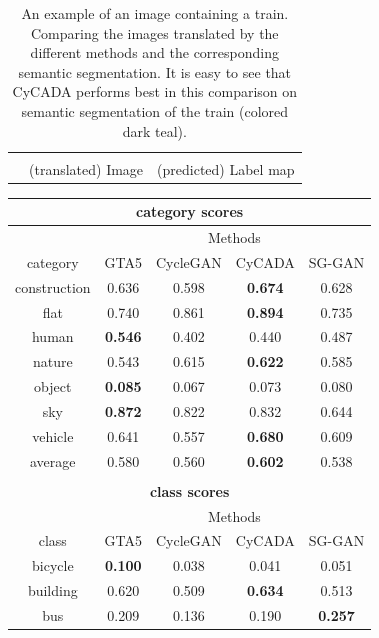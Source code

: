 \begin{table}
\begin{tabular}{cc||c}
\begin{minipage}[c]{0.45\textwidth}
		\end{minipage} \\
		\multicolumn{1}{c}{} & (translated) Image & (predicted) Label map
	\end{tabular} 
	\caption{An example of an image containing a train. Comparing the images translated by the different methods and the corresponding semantic segmentation. It is easy to see that CyCADA performs best in this comparison on semantic segmentation of the train (colored dark teal).}
	\label{table:train}
\end{table}

\begin{table}
	\centering
	\begin{tabular}{|c|c|c|c|c|}
		\multicolumn{5}{c}{\textbf{category scores}}\\
		\hline
		\multicolumn{1}{c}{} & \multicolumn{4}{c}{Methods}\\
		\cline{2-5}
		\multicolumn{1}{c|}{category} & GTA5 & CycleGAN & CyCADA & SG-GAN\\ 
		\hline
		construction & 0.636 & 0.598 & \textbf{0.674} & 0.628\\ 
		\hline 
		flat & 0.740 & 0.861 & \textbf{0.894} & 0.735\\ 
		\hline 
		human & \textbf{0.546} & 0.402 & 0.440 & 0.487\\ 
		\hline 
		nature & 0.543 & 0.615 & \textbf{0.622} & 0.585\\ 
		\hline 
		object & \textbf{0.085} & 0.067 & 0.073 & 0.080\\ 
		\hline 
		sky & \textbf{0.872} & 0.822 & 0.832 & 0.644\\ 
		\hline 
		vehicle & 0.641 & 0.557 & \textbf{0.680} & 0.609\\ 
		\hline \hline
		average & 0.580 & 0.560 & \textbf{0.602} & 0.538\\
		\hline
		\multicolumn{5}{c}{}\\
		\multicolumn{5}{c}{\textbf{class scores}}\\
		\hline
		\multicolumn{1}{c}{} & \multicolumn{4}{c}{Methods}\\
		\cline{2-5}
		\multicolumn{1}{c|}{class} & GTA5 & CycleGAN & CyCADA & SG-GAN\\ 
		\hline
		bicycle & \textbf{0.100} & 0.038 & 0.041 & 0.051\\ 
		\hline 
		building & 0.620 & 0.509 & \textbf{0.634} & 0.513\\ 
		\hline 
		bus & 0.209 & 0.136 & 0.190 & \textbf{0.257}\\ 

\end{tabular}
\end{table}

